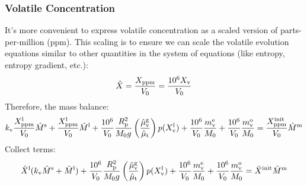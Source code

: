\subsubsection{Volatile Concentration}
It's more convenient to express volatile concentration as a scaled version of parts-per-million (ppm).  This scaling is to ensure we can scale the volatile evolution equations similar to other quantities in the system of equations (like entropy, entropy gradient, etc.):
\begin{equation}
\hat{X} = \frac{X_{\rm ppm}}{V_0} = \frac{10^6 X_{\rm v}}{V_0}
\end{equation}
Therefore, the mass balance:
\begin{equation}
k_{\rm v} \frac{X_{\rm ppm}^{\rm l}}{V_0} \hat{M}^{\rm s} + \frac{X_{\rm ppm}^{\rm l}}{V_0} \hat{M}^{\rm l} + \frac{10^6}{V_0} \frac{R_{\rm p}^2}{M_0 g} \left( \frac{\hat{\mu}_{\rm v}^{\rm g}}{\hat{\mu}_{\rm t}} \right) p (X_{\rm v}^{\rm l}) + \frac{10^6}{V_0} \frac{m_{\rm v}^{\rm e}}{M_0} + \frac{10^6}{V_0} \frac{m_{\rm v}^{\rm o}}{M_0} = \frac{X_{\rm ppm}^{\rm init}}{V_0} \hat{M}^{\rm m}
\end{equation}
Collect terms:
\begin{equation}
\hat{X}^{\rm l} (k_{\rm v} \hat{M}^{\rm s} + \hat{M}^{\rm l}) + \frac{10^6}{V_0}\frac{R_{\rm p}^2}{M_0 g} \left( \frac{\hat{\mu}_{\rm v}^{\rm g}}{\hat{\mu}_{\rm t}} \right) p (X_{\rm v}^{\rm l}) + \frac{10^6}{V_0} \frac{m_{\rm v}^{\rm e}}{M_0} + \frac{10^6}{V_0} \frac{m_{\rm v}^{\rm o}}{M_0} = \hat{X}^{\rm init} \hat{M}^{\rm m}
\end{equation}
